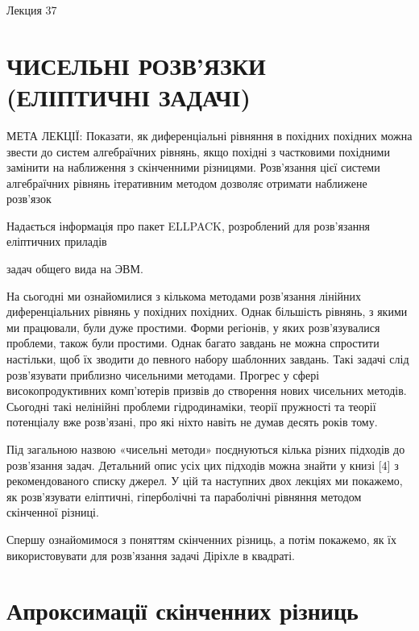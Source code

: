 \documentclass[
  ukrainian,
]{article}
\begin{document}
Лекция 37

\section{ЧИСЕЛЬНІ РОЗВ'ЯЗКИ (ЕЛІПТИЧНІ
ЗАДАЧІ)}\label{ux447ux438ux441ux435ux43bux44cux43dux456-ux440ux43eux437ux432ux44fux437ux43aux438-ux435ux43bux456ux43fux442ux438ux447ux43dux456-ux437ux430ux434ux430ux447ux456}

МЕТА ЛЕКЦІЇ: Показати, як диференціальні рівняння в похідних похідних
можна звести до систем алгебраїчних рівнянь, якщо похідні з частковими
похідними замінити на наближення з скінченними різницями. Розв'язання
цієї системи алгебраїчних рівнянь ітеративним методом дозволяє отримати
наближене розв'язок

Надається інформація про пакет ELLPACK, розроблений для розв'язання
еліптичних приладів

задач общего вида на ЭВМ.

На сьогодні ми ознайомилися з кількома методами розв'язання лінійних
диференціальних рівнянь у похідних похідних. Однак більшість рівнянь, з
якими ми працювали, були дуже простими. Форми регіонів, у яких
розв'язувалися проблеми, також були простими. Однак багато завдань не
можна спростити настільки, щоб їх зводити до певного набору шаблонних
завдань. Такі задачі слід розв'язувати приблизно чисельними методами.
Прогрес у сфері високопродуктивних комп'ютерів призвів до створення
нових чисельних методів. Сьогодні такі нелінійні проблеми гідродинаміки,
теорії пружності та теорії потенціалу вже розв'язані, про які ніхто
навіть не думав десять років тому.

Під загальною назвою «чисельні методи» поєднуються кілька різних
підходів до розв'язання задач. Детальний опис усіх цих підходів можна
знайти у книзі {[}4{]} з рекомендованого списку джерел. У цій та
наступних двох лекціях ми покажемо, як розв'язувати еліптичні,
гіперболічні та параболічні рівняння методом скінченної різниці.

Спершу ознайомимося з поняттям скінченних різниць, а потім покажемо, як
їх використовувати для розв'язання задачі Діріхле в квадраті.

\section{Апроксимації скінченних
різниць}\label{ux430ux43fux440ux43eux43aux441ux438ux43cux430ux446ux456ux457-ux441ux43aux456ux43dux447ux435ux43dux43dux438ux445-ux440ux456ux437ux43dux438ux446ux44c}
\end{document}
